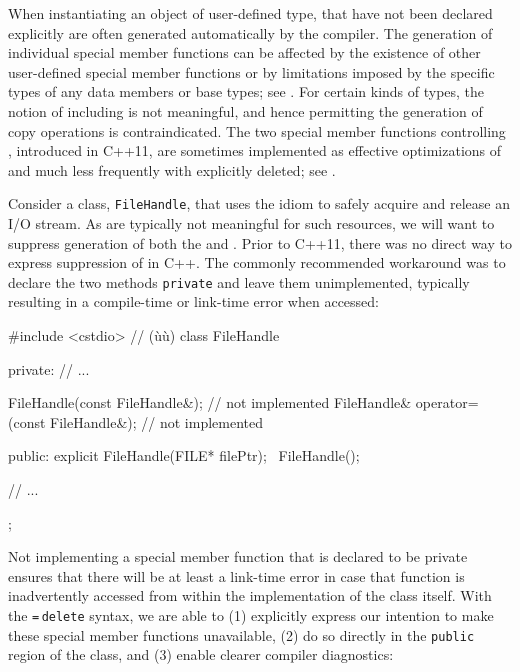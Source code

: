 When instantiating an object of user-defined type,  that have not been declared explicitly are
often generated automatically by the compiler.
The generation of individual special member
functions can be affected by the existence of other user-defined special
member functions or by limitations imposed by the specific types of
any data members or base types; see
. For certain kinds of types, the notion of 
including  is not meaningful, and
hence permitting the generation of copy operations is contraindicated. The two special member functions controlling , introduced in C++11, are sometimes implemented as effective optimizations of  and much less frequently with  explicitly deleted; see .

Consider a class, \lstinline!FileHandle!, that uses the  idiom
to safely acquire and release an I/O stream. As 
are typically not meaningful for such resources, we will want to
suppress generation of both the  and . Prior to C++11, there was no direct way to express
suppression of  in C++. The commonly
recommended workaround was to declare the two methods \lstinline!private!
and leave them unimplemented, typically resulting in a compile-time or
link-time error when accessed:

\begin{emcppslisting}
#include <cstdio>  // (ù{}ù)
class FileHandle
{
private:
    // ...

    FileHandle(const FileHandle&);             // not implemented
    FileHandle& operator=(const FileHandle&);  // not implemented

public:
    explicit FileHandle(FILE* filePtr);
    ~FileHandle();

    // ...
};
\end{emcppslisting}

\noindent Not implementing a special member function that is declared to be private ensures that there will be at least a link-time error in case that function is inadvertently accessed from within the implementation of the class itself. With the \lstinline!=!\,\lstinline!delete! syntax, we are able to (1)
explicitly express our intention to make these special member
functions unavailable, (2) do so directly in the \lstinline!public! region
of the class, and (3) enable clearer compiler diagnostics:

